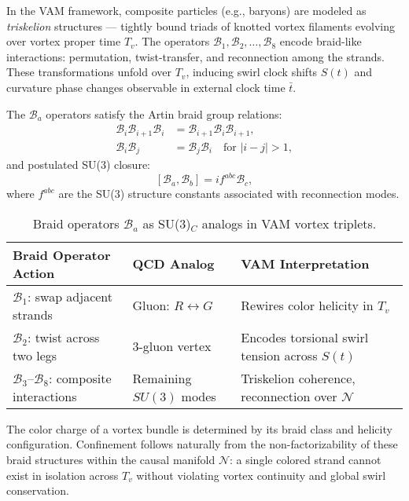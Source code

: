 In the VAM framework, composite particles (e.g., baryons) are modeled as \emph{triskelion} structures — tightly bound triads of knotted vortex filaments evolving over vortex proper time \( T_v \). The operators \( \mathcal{B}_1, \mathcal{B}_2, \dots, \mathcal{B}_8 \) encode braid-like interactions: permutation, twist-transfer, and reconnection among the strands. These transformations unfold over \( T_v \), inducing swirl clock shifts \( S(t) \) and curvature phase changes observable in external clock time \( \bar{t} \).

The \( \mathcal{B}_a \) operators satisfy the Artin braid group relations:
\[
\begin{aligned}
\mathcal{B}_i \mathcal{B}_{i+1} \mathcal{B}_i &= \mathcal{B}_{i+1} \mathcal{B}_i \mathcal{B}_{i+1}, \\
\mathcal{B}_i \mathcal{B}_j &= \mathcal{B}_j \mathcal{B}_i \quad \text{for } |i - j| > 1,
\end{aligned}
\]
and postulated SU(3) closure:
\[
[\mathcal{B}_a, \mathcal{B}_b] = i f^{abc} \mathcal{B}_c,
\]
where \( f^{abc} \) are the SU(3) structure constants associated with reconnection modes.

\begin{table}[H]
\centering
\scriptsize
\renewcommand{\arraystretch}{1.4}
\begin{tabular}{|l|l|l|}
\hline
\textbf{Braid Operator Action} & \textbf{QCD Analog} & \textbf{VAM Interpretation} \\
\hline
$ \mathcal{B}_1 $: swap adjacent strands & Gluon: \( R \leftrightarrow G \) & Rewires color helicity in $ T_v $ \\
$ \mathcal{B}_2 $: twist across two legs & 3-gluon vertex & Encodes torsional swirl tension across $ S(t) $ \\
$ \mathcal{B}_3$–$\mathcal{B}_8 $: composite interactions & Remaining $SU(3)$ modes & Triskelion coherence, reconnection over $ \mathcal{N} $ \\
\hline
\end{tabular}
\caption{Braid operators \( \mathcal{B}_a \) as SU(3)\(_C\) analogs in VAM vortex triplets.}
\end{table}

The color charge of a vortex bundle is determined by its braid class and helicity configuration. Confinement follows naturally from the non-factorizability of these braid structures within the causal manifold \( \mathcal{N} \): a single colored strand cannot exist in isolation across $ T_v $ without violating vortex continuity and global swirl conservation.

